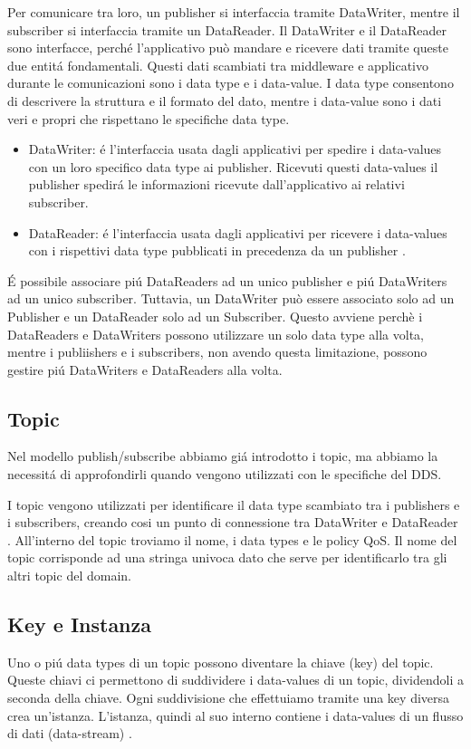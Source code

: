 Per comunicare tra loro, un publisher si interfaccia tramite
DataWriter, 
mentre il subscriber si interfaccia tramite un DataReader.
Il DataWriter e il DataReader sono interfacce, 
perché l'applicativo
può mandare e ricevere dati
tramite queste due entitá fondamentali. 
Questi dati scambiati tra middleware e applicativo durante le comunicazioni 
sono i data type e i data-value. I data type consentono di 
descrivere la struttura e il formato del dato, mentre i data-value
sono i dati veri e propri che rispettano le specifiche data type.
\begin{itemize}
    \item DataWriter: é l'interfaccia usata dagli applicativi 
    per spedire i
    data-values con un loro specifico data type ai publisher.
    Ricevuti questi data-values il publisher spedirá le
    informazioni ricevute dall'applicativo ai relativi subscriber.
    \item DataReader: é l'interfaccia usata dagli applicativi per
    ricevere i data-values con i rispettivi data type pubblicati in
    precedenza da un publisher \cite{dds1.4}.
\end{itemize}
É possibile
associare piú DataReaders ad un unico publisher e piú DataWriters ad
un unico subscriber. Tuttavia, un DataWriter può essere associato solo ad un 
Publisher e un DataReader solo ad un Subscriber. 
Questo avviene perchè
i DataReaders e DataWriters possono utilizzare un solo data type alla volta, 
mentre 
i publiishers e i subscribers, non avendo questa limitazione, possono gestire 
piú DataWriters e DataReaders alla volta.

\subsection{Topic}
Nel modello publish/subscribe abbiamo giá introdotto i topic, ma 
abbiamo la necessitá di approfondirli quando vengono utilizzati
con le specifiche del DDS.

I topic vengono utilizzati per identificare il data type
scambiato tra i publishers e i subscribers, creando cosi un punto
di connessione 
tra DataWriter e DataReader \cite{topicomg}.
All'interno del topic troviamo il nome,
i data types e le policy QoS.
Il nome del topic corrisponde ad una stringa univoca 
dato che serve per identificarlo 
tra gli altri topic del domain.


\subsection{Key e Instanza}
Uno o piú data types di un topic possono diventare la chiave (key) del topic. 
Queste chiavi ci permettono di suddividere
i data-values di un topic, dividendoli a seconda della chiave.
Ogni suddivisione che effettuiamo tramite una key diversa crea 
un'istanza. L'istanza, quindi al suo interno contiene i data-values di un 
flusso di dati (data-stream)
\cite{Instance81:online}.

